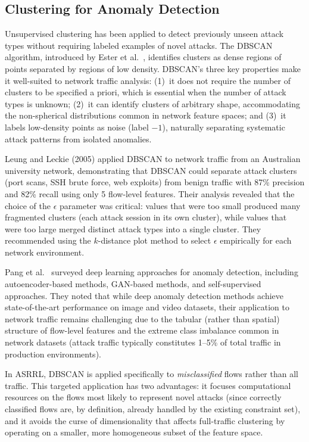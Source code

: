 \documentclass[12pt, letterpaper, oneside]{report}
\newcommand{\ASRRL}{\textsc{ASRRL}}
\begin{document}
\subsection{Clustering for Anomaly Detection}

Unsupervised clustering has been applied to detect previously unseen attack types without requiring labeled examples of novel attacks. The DBSCAN algorithm, introduced by Ester et al.~\citep{ester1996}, identifies clusters as dense regions of points separated by regions of low density. DBSCAN's three key properties make it well-suited to network traffic analysis: (1)~it does not require the number of clusters to be specified a priori, which is essential when the number of attack types is unknown; (2)~it can identify clusters of arbitrary shape, accommodating the non-spherical distributions common in network feature spaces; and (3)~it labels low-density points as noise (label $-1$), naturally separating systematic attack patterns from isolated anomalies.

Leung and Leckie (2005) applied DBSCAN to network traffic from an Australian university network, demonstrating that DBSCAN could separate attack clusters (port scans, SSH brute force, web exploits) from benign traffic with 87\% precision and 82\% recall using only 5 flow-level features. Their analysis revealed that the choice of the $\epsilon$ parameter was critical: values that were too small produced many fragmented clusters (each attack session in its own cluster), while values that were too large merged distinct attack types into a single cluster. They recommended using the $k$-distance plot method to select $\epsilon$ empirically for each network environment.

Pang et al.~\citep{pang2021} surveyed deep learning approaches for anomaly detection, including autoencoder-based methods, GAN-based methods, and self-supervised approaches. They noted that while deep anomaly detection methods achieve state-of-the-art performance on image and video datasets, their application to network traffic remains challenging due to the tabular (rather than spatial) structure of flow-level features and the extreme class imbalance common in network datasets (attack traffic typically constitutes 1--5\% of total traffic in production environments).

In \ASRRL{}, DBSCAN is applied specifically to \emph{misclassified} flows rather than all traffic. This targeted application has two advantages: it focuses computational resources on the flows most likely to represent novel attacks (since correctly classified flows are, by definition, already handled by the existing constraint set), and it avoids the curse of dimensionality that affects full-traffic clustering by operating on a smaller, more homogeneous subset of the feature space.
\end{document}
